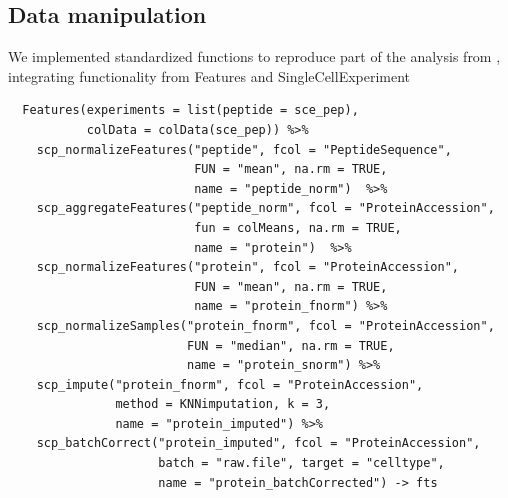 \documentclass{article}
\newcommand{\hcode}[2][lgray]{{\ttfamily\color{vdgray}\colorbox{#1}{#2}}}
\begin{document}
\begin{multicols}{2}
\begin{minipage}[t]{\linewidth}
  \section*{\huge Data manipulation}
  \large
  We implemented standardized functions to reproduce part of the analysis from \cite{Specht2019-jm}, integrating functionality from \hcode{Features} and \hcode{SingleCellExperiment}  
  \begin{lstlisting}
  Features(experiments = list(peptide = sce_pep), 
           colData = colData(sce_pep)) %>%
    scp_normalizeFeatures("peptide", fcol = "PeptideSequence",
                          FUN = "mean", na.rm = TRUE, 
                          name = "peptide_norm")  %>%
    scp_aggregateFeatures("peptide_norm", fcol = "ProteinAccession", 
                          fun = colMeans, na.rm = TRUE,
                          name = "protein")  %>%
    scp_normalizeFeatures("protein", fcol = "ProteinAccession",
                          FUN = "mean", na.rm = TRUE, 
                          name = "protein_fnorm") %>%
    scp_normalizeSamples("protein_fnorm", fcol = "ProteinAccession",
                         FUN = "median", na.rm = TRUE, 
                         name = "protein_snorm") %>%
    scp_impute("protein_fnorm", fcol = "ProteinAccession",
               method = KNNimputation, k = 3,
               name = "protein_imputed") %>%
    scp_batchCorrect("protein_imputed", fcol = "ProteinAccession",
                     batch = "raw.file", target = "celltype",
                     name = "protein_batchCorrected") -> fts

  \end{lstlisting}
\end{minipage}

\noindent
\begin{minipage}[t]{\linewidth}
  \vspace{0.5cm}

\end{minipage}
\end{multicols}
\end{document}
